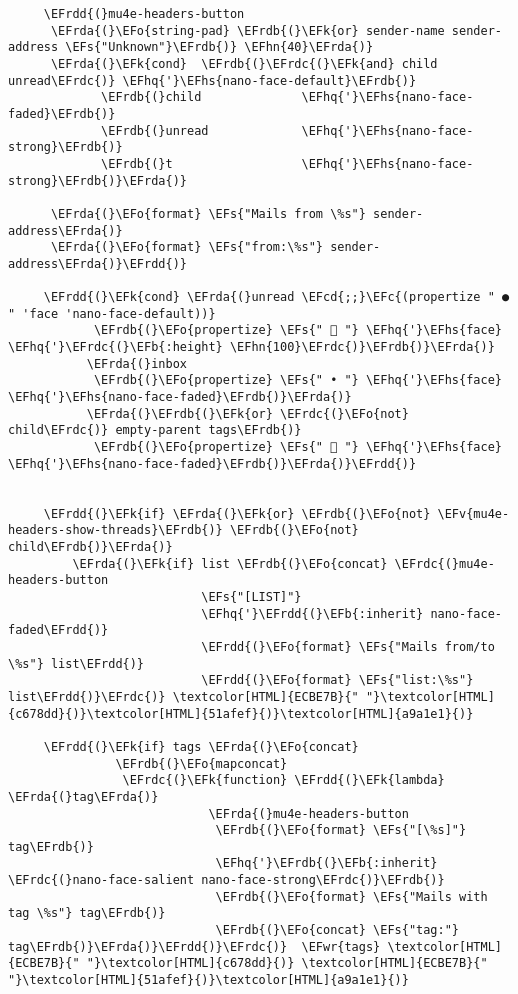 \documentclass[a4wide,10pt]{article}
\newcommand{\EFc}[1]{\textcolor{EFc}{#1}} %
\newcommand{\EFcd}[1]{\textcolor{EFcd}{#1}} %
\newcommand{\EFs}[1]{\textcolor{EFs}{#1}} %
\newcommand{\EFk}[1]{\textcolor{EFk}{#1}} %
\newcommand{\EFb}[1]{\textcolor{EFb}{#1}} %
\newcommand{\EFv}[1]{\textcolor{EFv}{#1}} %
\newcommand{\EFo}[1]{\textcolor{EFo}{#1}} %
\newcommand{\EFwr}[1]{\textcolor{EFwr}{#1}} %
\newcommand{\EFhn}[1]{\textcolor{EFhn}{\textbf{#1}}} %
\newcommand{\EFhq}[1]{\textcolor{EFhq}{#1}} %
\newcommand{\EFhs}[1]{\textcolor{EFhs}{#1}} %
\newcommand{\EFrda}[1]{\textcolor{EFrda}{#1}} %
\newcommand{\EFrdb}[1]{\textcolor{EFrdb}{#1}} %
\newcommand{\EFrdc}[1]{\textcolor{EFrdc}{#1}} %
\newcommand{\EFrdd}[1]{\textcolor{EFrdd}{#1}} %
\begin{document}
\begin{Code}
\begin{Verbatim}
     \EFrdd{(}mu4e-headers-button
      \EFrda{(}\EFo{string-pad} \EFrdb{(}\EFk{or} sender-name sender-address \EFs{"Unknown"}\EFrdb{)} \EFhn{40}\EFrda{)}
      \EFrda{(}\EFk{cond}  \EFrdb{(}\EFrdc{(}\EFk{and} child unread\EFrdc{)} \EFhq{'}\EFhs{nano-face-default}\EFrdb{)}
             \EFrdb{(}child              \EFhq{'}\EFhs{nano-face-faded}\EFrdb{)}
             \EFrdb{(}unread             \EFhq{'}\EFhs{nano-face-strong}\EFrdb{)}
             \EFrdb{(}t                  \EFhq{'}\EFhs{nano-face-strong}\EFrdb{)}\EFrda{)}

      \EFrda{(}\EFo{format} \EFs{"Mails from \%s"} sender-address\EFrda{)}
      \EFrda{(}\EFo{format} \EFs{"from:\%s"} sender-address\EFrda{)}\EFrdd{)}

     \EFrdd{(}\EFk{cond} \EFrda{(}unread \EFcd{;;}\EFc{(propertize " ● " 'face 'nano-face-default))}
            \EFrdb{(}\EFo{propertize} \EFs{"  "} \EFhq{'}\EFhs{face} \EFhq{'}\EFrdc{(}\EFb{:height} \EFhn{100}\EFrdc{)}\EFrdb{)}\EFrda{)}
           \EFrda{(}inbox
            \EFrdb{(}\EFo{propertize} \EFs{" • "} \EFhq{'}\EFhs{face} \EFhq{'}\EFhs{nano-face-faded}\EFrdb{)}\EFrda{)}
           \EFrda{(}\EFrdb{(}\EFk{or} \EFrdc{(}\EFo{not} child\EFrdc{)} empty-parent tags\EFrdb{)}
            \EFrdb{(}\EFo{propertize} \EFs{"  "} \EFhq{'}\EFhs{face} \EFhq{'}\EFhs{nano-face-faded}\EFrdb{)}\EFrda{)}\EFrdd{)}


     \EFrdd{(}\EFk{if} \EFrda{(}\EFk{or} \EFrdb{(}\EFo{not} \EFv{mu4e-headers-show-threads}\EFrdb{)} \EFrdb{(}\EFo{not} child\EFrdb{)}\EFrda{)}
         \EFrda{(}\EFk{if} list \EFrdb{(}\EFo{concat} \EFrdc{(}mu4e-headers-button
                           \EFs{"[LIST]"}
                           \EFhq{'}\EFrdd{(}\EFb{:inherit} nano-face-faded\EFrdd{)}
                           \EFrdd{(}\EFo{format} \EFs{"Mails from/to \%s"} list\EFrdd{)}
                           \EFrdd{(}\EFo{format} \EFs{"list:\%s"} list\EFrdd{)}\EFrdc{)} \textcolor[HTML]{ECBE7B}{" "}\textcolor[HTML]{c678dd}{)}\textcolor[HTML]{51afef}{)}\textcolor[HTML]{a9a1e1}{)}

     \EFrdd{(}\EFk{if} tags \EFrda{(}\EFo{concat}
               \EFrdb{(}\EFo{mapconcat}
                \EFrdc{(}\EFk{function} \EFrdd{(}\EFk{lambda} \EFrda{(}tag\EFrda{)}
                            \EFrda{(}mu4e-headers-button
                             \EFrdb{(}\EFo{format} \EFs{"[\%s]"} tag\EFrdb{)}
                             \EFhq{'}\EFrdb{(}\EFb{:inherit} \EFrdc{(}nano-face-salient nano-face-strong\EFrdc{)}\EFrdb{)}
                             \EFrdb{(}\EFo{format} \EFs{"Mails with tag \%s"} tag\EFrdb{)}
                             \EFrdb{(}\EFo{concat} \EFs{"tag:"} tag\EFrdb{)}\EFrda{)}\EFrdd{)}\EFrdc{)}  \EFwr{tags} \textcolor[HTML]{ECBE7B}{" "}\textcolor[HTML]{c678dd}{)} \textcolor[HTML]{ECBE7B}{" "}\textcolor[HTML]{51afef}{)}\textcolor[HTML]{a9a1e1}{)}


\end{Verbatim}
\end{Code}
\end{document}
